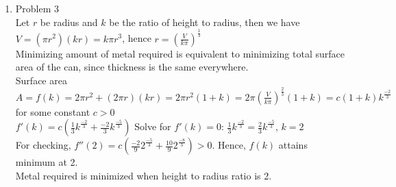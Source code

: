 \documentclass[leqno,12pt]{article}
\begin{document}
\begin{enumerate}
\item Problem 3\\
Let $r$ be radius and $k$ be the ratio of height to radius, then we have $V=(\pi r^2)(kr)=k\pi r^3$, hence $r=\left(\frac{V}{k\pi}\right)^{\frac{1}{3}}$\\
Minimizing amount of metal required is equivalent to minimizing total surface area of the can, since thickness is the same everywhere.\\
Surface area $A=f(k)=2\pi r^2+(2\pi r)(kr)=2\pi r^2(1+k)=2\pi\left(\frac{V}{k\pi}\right)^{\frac{2}{3}}\left(1+k\right)=c(1+k)k^{\frac{-2}{3}}$ for some constant $c>0$\\
$f'(k)=c\left(\frac{1}{3}k^{\frac{-2}{3}}+\frac{-2}{3}k^{\frac{-5}{3}}\right)$
Solve for $f'(k)=0$: $\frac{1}{3}k^{\frac{-2}{3}}=\frac{2}{3}k^{\frac{-5}{3}}$, $k=2$\\
For checking, $f''(2)=c\left(\frac{-2}{9}2^{\frac{-5}{3}}+\frac{10}{9}2^{\frac{-8}{3}}\right)>0$. Hence, $f(k)$ attains minimum at 2.\\
Metal required is minimized when height to radius ratio is 2.\\

\pagebreak


\end{enumerate}
\end{document}
